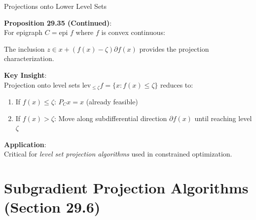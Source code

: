 \documentclass[aspectratio=169,10pt]{beamer}
\begin{document}
\begin{frame}{Projections onto Lower Level Sets}

    \textbf{Proposition 29.35 (Continued)}:\\
    For epigraph $C = \text{epi } f$ where $f$ is convex continuous:

    The inclusion $z \in x + (f(x) - \zeta)\partial f(x)$ provides the projection characterization.

    \vspace{0.5cm}

    \textbf{Key Insight}:\\
    Projection onto level sets $\text{lev}_{\leq \zeta} f = \{x : f(x) \leq \zeta\}$ reduces to:
    \begin{enumerate}
        \item If $f(x) \leq \zeta$: $P_C x = x$ (already feasible)
        \item If $f(x) > \zeta$: Move along subdifferential direction $\partial f(x)$ until reaching level $\zeta$
    \end{enumerate}

    \vspace{0.5cm}

    \textbf{Application}:\\
    Critical for \textit{level set projection algorithms} used in constrained optimization.

\end{frame}

\section{Subgradient Projection Algorithms (Section 29.6)}
\end{document}
